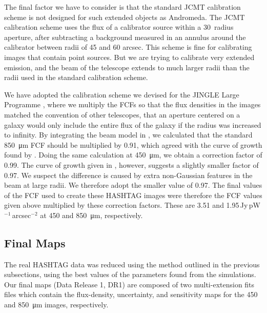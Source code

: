 \documentclass[a4paper,fleqn,usenatbib, twocolumn]{aastex63}
\begin{document}
The final factor we have to consider is that the standard JCMT calibration scheme
is not designed for such extended objects as Andromeda.
The JCMT calibration scheme \citep{Dempsey2013} uses 
the flux of a calibrator source within a 30\arcsec\ radius aperture,
after subtracting a background measured in an annulus around the calibrator between
radii of 45 and 60 arcsec. This scheme is fine for calibrating images that
contain point sources. But we are trying to calibrate very extended emission, and
the beam of the telescope extends to much larger radii than the radii used in
the standard calibration scheme.

We have adopted the calibration scheme we devised for the JINGLE Large Programme \citep{Smith2019}, where we multiply the FCFs so that the flux densities in the images matched the convention of other telescopes, that an aperture centered on a galaxy would only include the entire flux of the galaxy if the radius was increased
to infinity. By integrating the beam model in \citet{Dempsey2013},
we calculated that the standard \SI{850}{\micro\meter} FCF should be multiplied by 0.91, which agreed with the curve of growth found by \citet{Dempsey2013}. 
Doing the same calculation at \SI{450}{\micro\meter}, we obtain a correction factor of 0.99. The curve of growth given in \citet{Dempsey2013}, however,
suggests a slightly smaller factor of 0.97. We suspect the
difference is caused by extra non-Gaussian features in the beam at large radii.
We therefore adopt the smaller value of 0.97. The final values of the FCF used to 
create these HASHTAG images were therefore the FCF values given above multiplied
by these correction factors. These are 3.51 and 1.95\,Jy\,pW$^{-1}$\,arcsec$^{-2}$ at 450 and \SI{850}{\micro\meter}, respectively.


\subsection{Final Maps}
\label{sec:finalMaps}

The real HASHTAG data was reduced using the method outlined in the previous
subsections, using the best values of the parameters found from the simulations.
Our final maps (Data Release 1, DR1) are composed of two multi-extension fits files which contain the flux-density, uncertainty, and sensitivity maps for the 
450 and \SI{850}{\micro\meter} images, respectively. 
\end{document}
